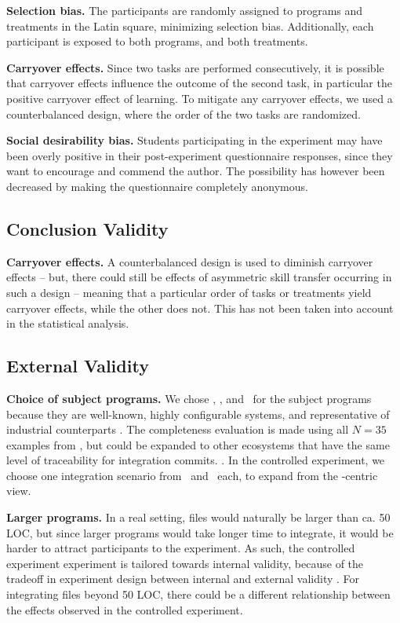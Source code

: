 \textbf{Selection bias.} The participants are randomly assigned to programs and treatments in the Latin square, minimizing selection bias. Additionally, each participant is exposed to both programs, and both treatments.

\textbf{Carryover effects.} Since two tasks are performed consecutively, it is possible that carryover effects influence the outcome of the second task, in particular the positive carryover effect of learning. To mitigate any carryover effects, we used a counterbalanced design, where the order of the two tasks are randomized.

\textbf{Social desirability bias.} Students participating in the experiment may have been overly positive in their post-experiment questionnaire responses, since they want to encourage and commend the author. The possibility has however been decreased by making the questionnaire completely anonymous.

\subsection{Conclusion Validity}

\textbf{Carryover effects.} A counterbalanced design is used to diminish carryover effects -- but, there could still be effects of asymmetric skill transfer occurring in such a design -- meaning that a particular order of tasks or treatments yield carryover effects, while the other does not. This has not been taken into account in the statistical analysis.

\subsection{External Validity}
\textbf{Choice of subject programs.} We chose \marlin, \busybox, and \vim~for the subject programs because they are well-known, highly configurable systems, and representative of industrial counterparts \cite{hunsen2016}. The completeness evaluation is made using all $N=35$ examples from \marlin, but could be expanded to other ecosystems that have the same level of traceability for integration commits. . In the controlled experiment, we choose one integration scenario from \busybox~and \vim~each, to expand from the \marlin-centric view. 

\textbf{Larger programs.} In a real setting, files would naturally be larger than ca. 50 LOC, but since larger programs would take longer time to integrate, it would be harder to attract participants to the experiment. As such, the controlled experiment experiment is tailored towards internal validity, because of the tradeoff in experiment design between internal and external validity \cite{siegmund2015}. For integrating files beyond 50 LOC, there could be a different relationship between the effects observed in the controlled experiment.


